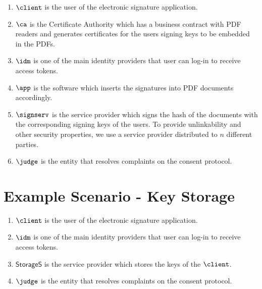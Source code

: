 \begin{enumerate}
    \item $\client$ is the user of the electronic signature application.
    \item $\ca$ is the Certificate Authority which has a business contract with PDF readers and generates certificates for the users signing keys to be embedded in the PDFs.
    \item $\idm$ is one of the main identity providers that user can log-in to receive access tokens.
    \item $\app$ is the software which inserts the signatures into PDF documents accordingly.
    \item $\signserv$ is the service provider which signs the hash of the documents with the corresponding signing keys of the users. To provide unlinkability and other security properties, we use a service provider distributed to $n$ different parties.
    \item $\judge$ is the entity that resolves complaints on the consent protocol.
\end{enumerate}

\section{Example Scenario - Key Storage}

\begin{enumerate}
    \item $\client$ is the user of the electronic signature application.
    \item $\idm$ is one of the main identity providers that user can log-in to receive access tokens.
    \item $\mathsf{StorageS}$ is the service provider which stores the keys of the $\client$.
    \item $\judge$ is the entity that resolves complaints on the consent protocol.
\end{enumerate}